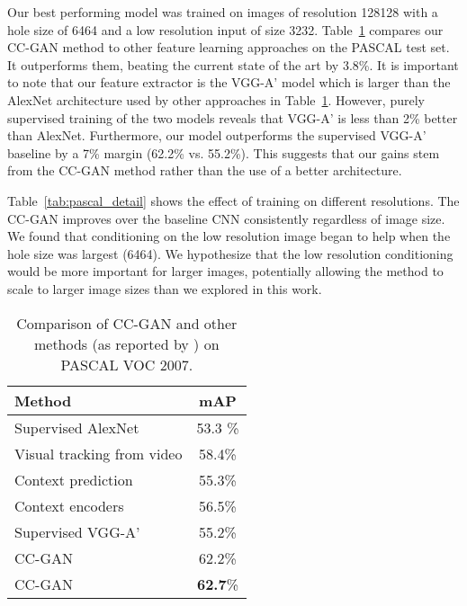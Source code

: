 \documentclass{article} \usepackage{iclr2017_conference,times}
\newcommand{\tab}[1]{Table~\ref{tab:#1}}
\begin{document}
Our best performing model was trained on images of resolution
128128 with a hole size of 6464 and a low resolution
input of size 3232.  \tab{pascal} compares our CC-GAN method
to other feature learning approaches on the PASCAL test set. It
outperforms them, beating the current state of the art \citep{wang2015} by 3.8\%. It is
important to note that our feature extractor is the VGG-A' model which
is larger than the AlexNet architecture \citep{krizhevsky2012} used by
other approaches in \tab{pascal}.  However, purely supervised training
of the two models reveals that VGG-A' is less than 2\% better than
AlexNet. Furthermore, our model outperforms the supervised VGG-A'
baseline by a 7\% margin (62.2\% vs. 55.2\%).  This suggests that our
gains stem from the CC-GAN method rather than the use of a better
architecture.


\tab{pascal_detail} shows the effect of training on different
resolutions.  The CC-GAN improves over the baseline CNN consistently
regardless of image size.  We found that conditioning on the low
resolution image began to help when the hole size was largest
(6464).  We hypothesize that the low resolution conditioning
would be more important for larger images, potentially allowing the
method to scale to larger image sizes than we explored in this work.

\begin{table}[t]
\centering
\small
\begin{tabularx}{0.7\textwidth}{l|c}
\bf{Method} & \bf{mAP}\\
\hline
\hline
Supervised AlexNet & 53.3 \%\\
Visual tracking from video \citep{wang2015} & 58.4\% \\
Context prediction \citep{doersch2015} & 55.3\%\\
Context encoders \citep{pathak2016} & 56.5\% \\
\hline
Supervised VGG-A' & 55.2\%\\
CC-GAN  & 62.2\%\\
CC-GAN  & {\bf 62.7}\%\\
\end{tabularx}
\vspace{2mm}
\caption{Comparison of CC-GAN and other methods (as reported by \cite{pathak2016}) on PASCAL VOC 2007.}
\label{tab:pascal}
\end{table}
\end{document}
